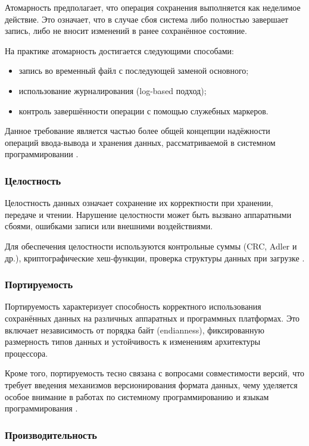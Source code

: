 \documentclass[coursework]{SCWorks}
\begin{document}
Атомарность предполагает, что операция сохранения выполняется как неделимое действие. Это означает, что в случае сбоя система либо полностью завершает запись, либо не вносит изменений в ранее сохранённое состояние.

На практике атомарность достигается следующими способами:
\begin{itemize}
    \item запись во временный файл с последующей заменой основного;
    \item использование журналирования (log-based подход);
    \item контроль завершённости операции с помощью служебных маркеров.
\end{itemize}

Данное требование является частью более общей концепции надёжности операций ввода-вывода и хранения данных, рассматриваемой в системном программировании \cite{tanenbaum2015modern, stevens2013advanced}.

\subsubsection{Целостность}

Целостность данных означает сохранение их корректности при хранении, передаче и чтении. Нарушение целостности может быть вызвано аппаратными сбоями, ошибками записи или внешними воздействиями.

Для обеспечения целостности используются контрольные суммы (CRC, Adler и др.), криптографические хеш-функции, проверка структуры данных при загрузке \cite{tanenbaum2015modern}.

\subsubsection{Портируемость}

Портируемость характеризует способность корректного использования сохранённых данных на различных аппаратных и программных платформах. Это включает независимость от порядка байт (endianness), фиксированную размерность типов данных и устойчивость к изменениям архитектуры процессора.

Кроме того, портируемость тесно связана с вопросами совместимости версий, что требует введения механизмов версионирования формата данных, чему уделяется особое внимание в работах по системному программированию и языкам программирования \cite{stroustrup2013cpp, meyers2005effective}.

\subsubsection{Производительность}
\end{document}

